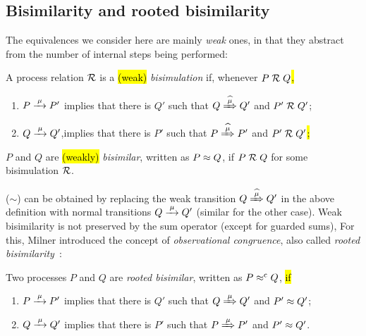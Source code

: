 \subsection{Bisimilarity and rooted bisimilarity}
\label{ss:BiEx}

The equivalences we consider here are mainly \emph{weak} ones, in that they
abstract from the number of internal steps being performed:
\begin{definition}%
\label{d:wb}
A process relation ${{\cal R}}$ is a \hl{(weak)} \emph{bisimulation} if, whenever
 $P\mathrel{\cal R} Q$\hl{,} %
\begin{enumerate}
\item $P \arr\mu P'$ implies that there is $Q'$ such that $Q \Arcap \mu Q'$ and $P' \mathrel{\cal R} Q'$;
\item $Q \arr\mu Q'$,implies that there is $P'$ such that $P \Arcap
  \mu P'$ and $P' \mathrel{\cal R} Q'$\hl{;}
\end{enumerate}
 $P$ and $Q$ are \hl{(weakly)} \emph{bisimilar},
written as $P \approx Q$, if $P \mathrel{\cal R} Q$ for some bisimulation ${\cal R}$.
\end{definition}

 ($\sim$)
can be obtained by replacing the weak transition $Q\Arcap\mu Q'$ in the above
definition with normal transitions $Q \arr \mu Q'$ (similar for the other case).
Weak bisimilarity is not preserved by the sum operator (except for
guarded sums), 
For this, Milner introduced the concept of \emph{observational congruence}, also called \emph{rooted
  bisimilarity}~\cite{Gorrieri:2015jt,Sangiorgi:2011ut}:
\begin{definition}%
\label{d:rootedBisimilarity}
Two processes $P$ and $Q$ are \emph{rooted bisimilar}, written as $P
\mathrel{\approx^{\rm{c}}} Q$, \hl{if} %
\begin{enumerate}
 \item  $P \arr\mu P'$ implies that there is $Q'$ such that $Q
   \Arr\mu Q'$ and $P' \approx Q'$;
 \item  $Q \arr\mu Q'$ implies that there is $P'$ such that $P
   \Arr\mu P'$ and $P' \approx Q'$\enspace.
\end{enumerate}
\end{definition}

